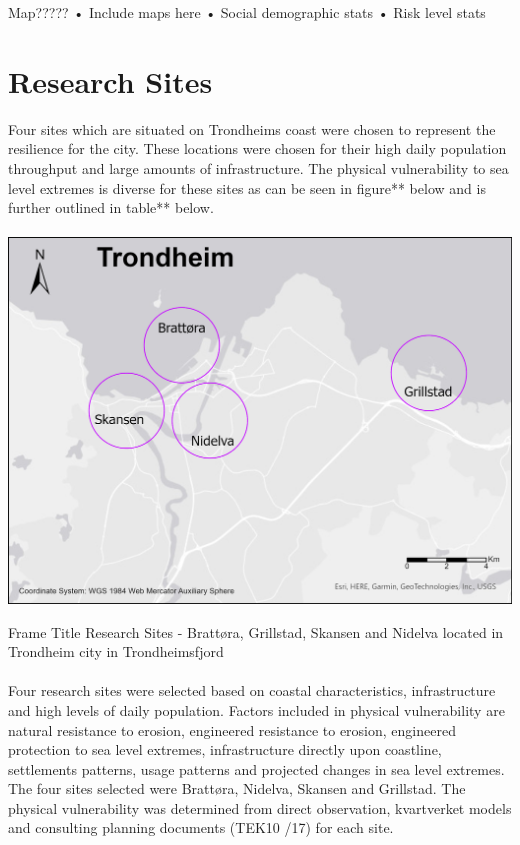 Map?????
•	Include maps here 
•	Social demographic stats
•	Risk level stats

\section{Research Sites}
Four sites which are situated on Trondheims coast were chosen to represent the resilience for the city. These locations were chosen for their high daily population throughput and large amounts of infrastructure. The physical vulnerability to sea level extremes is diverse for these sites as can be seen in figure** below and is further outlined in table** below. 
\paragraph{}
\includegraphics[width=1.0\textwidth]{fig/trondheim_research_sites_grey_circles.png}
\begin{frame}{Frame Title}
    Research Sites - Brattøra, Grillstad, Skansen and Nidelva located in Trondheim city in Trondheimsfjord
\end{frame}

\paragraph{}

Four research sites were selected based on coastal characteristics, infrastructure and high levels of daily population. Factors included in physical vulnerability are natural resistance to erosion, engineered resistance to erosion, engineered protection to sea level extremes, infrastructure directly upon coastline, settlements patterns, usage patterns and projected changes in sea level extremes. The four sites selected were Brattøra, Nidelva, Skansen and Grillstad. The physical vulnerability was determined from direct observation, kvartverket models and consulting planning documents (TEK10 /17) for each site. \cite{miljoenheten_og_byplankontoret_trondheim_kommune_9-notat-om-havnivastigning-og-stormflo---hensyn-i-arealplanlegging-nyhavnapdf_2020}


